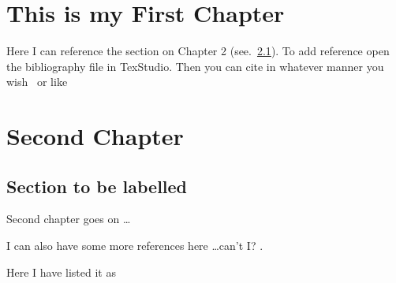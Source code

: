 \documentclass[openany]{book}
\begin{document}
\chapter{This is my First Chapter}

Here I can reference the section on Chapter 2 (see.~\cref{sec_label}). To add reference open the bibliography file in TexStudio. Then you can cite in whatever manner you wish~\citet{Agn2007} or like~\citep{Choi2005,Dasari2000,frisch1995}

\chapter{Second Chapter}
\section{Section to be labelled}  \label{sec_label}
Second chapter goes on \dots

I can also have some more references here \dots can't I? \citet{Gallouat2010}.

Here I have listed it as \citep[see][]{mehta1994}





\begin{spacing}{0.9}
\renewcommand{\bibname}{References} %
\cleardoublepage
{} %

\end{spacing}
\end{document}
